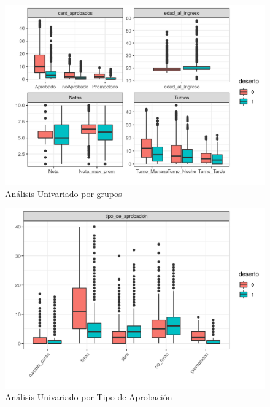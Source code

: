 















\begin{figure}[!htb]
	\centering
	\includegraphics{imagenes/imagenes/gg_explo_tablon_grupo.png}
	\caption{Análisis Univariado por grupos}
	\label{fig:tablon_boxplot_grupo}
\end{figure}

\begin{figure}[!htb]
	\centering
	\includegraphics{imagenes/imagenes/gg_explo_tablon_tipo_aprob.png}
	\caption{Análisis Univariado por Tipo de Aprobación}
	\label{fig:tablon_boxplot_tipoAprobacion}
\end{figure}

